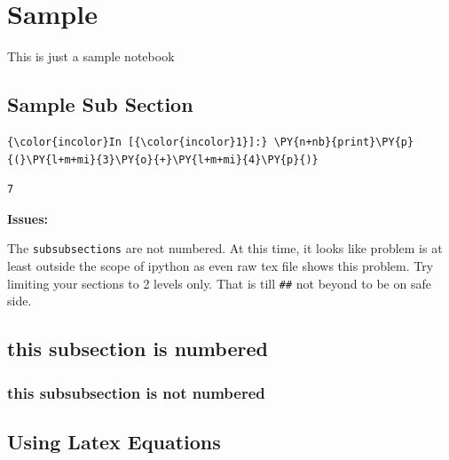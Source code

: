 \documentclass[float=false,crop=false]{standalone}
\begin{document}
    
    
    \maketitle
    
    

    
    \section{Sample}\label{sample}

This is just a sample notebook

\subsection{Sample Sub Section}\label{sample-sub-section}

   \begin{Verbatim}[commandchars=\\\{\},fontsize=\scriptsize]
{\color{incolor}In [{\color{incolor}1}]:} \PY{n+nb}{print}\PY{p}{(}\PY{l+m+mi}{3}\PY{o}{+}\PY{l+m+mi}{4}\PY{p}{)}
\end{Verbatim}

    \begin{Verbatim}[commandchars=\\\{\},fontsize=\footnotesize]
7

    \end{Verbatim}

    \textbf{Issues:}

The \texttt{subsubsections} are not numbered. At this time, it looks
like problem is at least outside the scope of ipython as even raw tex
file shows this problem. Try limiting your sections to 2 levels only.
That is till \texttt{\#\#} not beyond to be on safe side.

\subsection{this subsection is
numbered}\label{this-subsection-is-numbered}

\subsubsection{this subsubsection is not
numbered}\label{this-subsubsection-is-not-numbered}

    \subsection{Using Latex Equations}\label{using-latex-equations}
\end{document}
